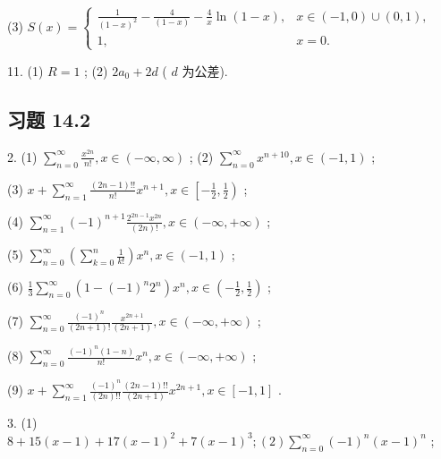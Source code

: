 (3) \(S\left( x\right)  = \left\{  \begin{array}{ll} \frac{1}{{\left( 1 - x\right) }^{2}} - \frac{4}{\left( 1 - x\right) } - \frac{4}{x}\ln \left( {1 - x}\right) , & x \in  \left( {-1,0}\right)  \cup  \left( {0,1}\right) , \\  1, & x = 0. \end{array}\right.\)

11. (1) \(R = 1\) ; (2) \(2{a}_{0} + {2d}\) ( \(d\) 为公差).

\subsection{习题 14.2}

2. (1) \(\mathop{\sum }\limits_{{n = 0}}^{\infty }\frac{{x}^{2n}}{n!},x \in  \left( {-\infty ,\infty }\right)\) ; (2) \(\mathop{\sum }\limits_{{n = 0}}^{\infty }{x}^{n + {10}},x \in  \left( {-1,1}\right)\) ;

(3) \(x + \mathop{\sum }\limits_{{n = 1}}^{\infty }\frac{\left( {{2n} - 1}\right) !!}{n!}{x}^{n + 1},x \in  \left\lbrack  {-\frac{1}{2},\frac{1}{2}}\right)\) ;

(4) \(\mathop{\sum }\limits_{{n = 1}}^{\infty }{\left( -1\right) }^{n + 1}\frac{{2}^{{2n} - 1}{x}^{2n}}{\left( {2n}\right) !},x \in  \left( {-\infty , + \infty }\right)\) ;

(5) \(\mathop{\sum }\limits_{{n = 0}}^{\infty }\left( {\mathop{\sum }\limits_{{k = 0}}^{n}\frac{1}{k!}}\right) {x}^{n},x \in  \left( {-1,1}\right)\) ;

(6) \(\frac{1}{3}\mathop{\sum }\limits_{{n = 0}}^{\infty }\left( {1 - {\left( -1\right) }^{n}{2}^{n}}\right) {x}^{n},x \in  \left( {-\frac{1}{2},\frac{1}{2}}\right)\) ;

(7) \(\mathop{\sum }\limits_{{n = 0}}^{\infty }\frac{{\left( -1\right) }^{n}}{\left( {{2n} + 1}\right) !}\frac{{x}^{{2n} + 1}}{\left( 2n + 1\right) },x \in  \left( {-\infty , + \infty }\right)\) ;

(8) \(\mathop{\sum }\limits_{{n = 0}}^{\infty }\frac{{\left( -1\right) }^{n}\left( {1 - n}\right) }{n!}{x}^{n},x \in  \left( {-\infty , + \infty }\right)\) ;

(9) \(x + \mathop{\sum }\limits_{{n = 1}}^{\infty }\frac{{\left( -1\right) }^{n}}{\left( {2n}\right) !!}\frac{\left( {{2n} - 1}\right) !!}{\left( 2n + 1\right) }{x}^{{2n} + 1},x \in  \left\lbrack  {-1,1}\right\rbrack\) .

3. (1) \(8 + {15}\left( {x - 1}\right)  + {17}{\left( x - 1\right) }^{2} + 7{\left( x - 1\right) }^{3};\left( 2\right) \mathop{\sum }\limits_{{n = 0}}^{\infty }{\left( -1\right) }^{n}{\left( x - 1\right) }^{n}\) ;

